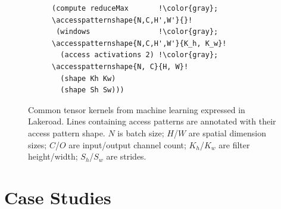 \documentclass[prologue, dvipsnames, sigplan, screen, review, anonymous]{acmart}
\newcommand{\g}{Lakeroad\xspace}
\newcommand{\accesspatternshape}[2]{$($$\left( #1 \right)$, $\left( #2 \right)$$)$}
\newcommand{\tcd}[1]{\texttt{#1}}
\begin{document}
\begin{figure}
\begin{minipage}{.45\textwidth}
\begin{subfigure}{\textwidth}
\begin{lstlisting}[escapechar=!]
(compute reduceMax       !\color{gray}; \accesspatternshape{N,C,H',W'}{}!
 (windows                !\color{gray}; \accesspatternshape{N,C,H',W'}{K_h, K_w}!
  (access activations 2) !\color{gray}; \accesspatternshape{N, C}{H, W}!
  (shape Kh Kw)
  (shape Sh Sw)))
\end{lstlisting}
  \vspace{-1em} 
  \label{fig:maxpool-code}
\end{subfigure}

\end{minipage}
\caption{Common tensor kernels from machine learning expressed in \g. Lines containing access patterns are annotated with their access pattern shape.
$N$ is batch size; $H$/$W$ are spatial dimension sizes; $C$/$O$ are input/output channel count; $K_h$/$K_w$ are filter height/width; $S_h$/$S_w$ are strides.
}
\label{fig:all-kernels}
\end{figure}

\section{Case Studies}
\label{sec:case-studies}

%  
%  
%
\end{document}
